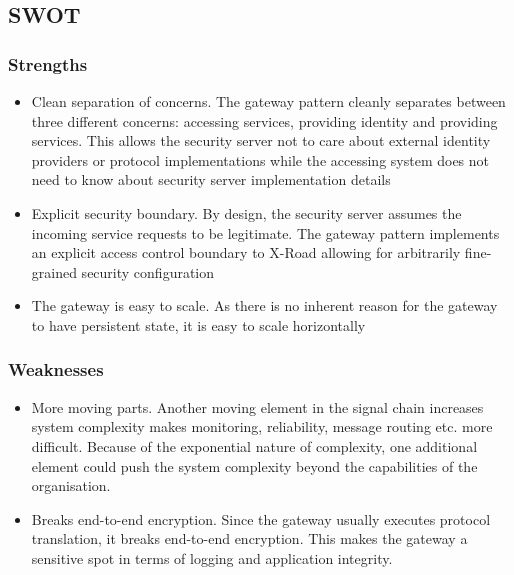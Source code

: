 \documentclass[10pt,a4paper]{article}
\begin{document}
\subsection{SWOT}
\subsubsection{Strengths}
\begin{itemize}
	\item Clean separation of concerns. The gateway pattern cleanly separates between three different concerns: accessing services, providing identity and providing services. This allows the security server not to care about external identity providers or protocol implementations while the accessing system does not need to know about security server implementation details
	\item Explicit security boundary. By design, the security server assumes the incoming service requests to be legitimate. The gateway pattern implements an explicit access control boundary to X-Road allowing for arbitrarily fine-grained security configuration 
	\item The gateway is easy to scale. As there is no inherent reason for the gateway to have persistent state, it is easy to scale horizontally
\end{itemize}

\subsubsection{Weaknesses}
\begin{itemize}
	\item More moving parts. Another moving element in the signal chain increases system complexity makes monitoring, reliability, message routing etc. more difficult. Because of the exponential nature of complexity, one additional element could push the system complexity beyond the capabilities of the organisation.
	\item Breaks end-to-end encryption. Since the gateway usually executes protocol translation, it breaks end-to-end encryption. This makes the gateway a sensitive spot in terms of logging and application integrity. 
\end{itemize}
	
\end{document}
